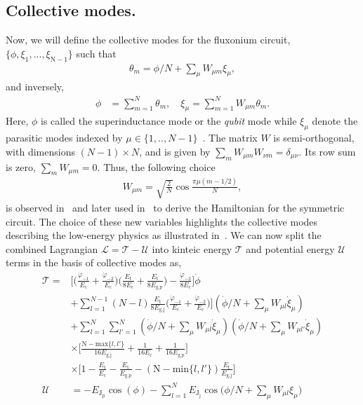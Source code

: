 \documentclass[%
reprint,
superscriptaddress,
 amsmath,amssymb,
 aps,
 prx,
longbibliography,
floatfix,
]{revtex4-2}
\begin{document}
\subsection{Collective modes.} 
Now, we will define the collective modes for the fluxonium circuit, $\{\phi,\xi_1,...,\xi_{\textrm{N}-1}\}$ such that 
\begin{align}
    \theta_m=\phi/N+\sum_\mu W_{\mu m}\xi_\mu,
\end{align}
and inversely,
\begin{align}
    \phi&=\sum_{m=1}^N\theta_m,\quad \xi_\mu=\sum_{m=1}^N W_{\mu m}\theta_m.
\end{align}
Here, $\phi$ is called the superinductance mode or the \emph{qubit} mode while $\xi_\mu$ denote the parasitic modes indexed by $\mu\in\{1,..,N-1\}$~\cite{ferguson2013symmetries}. The matrix $W$ is semi-orthogonal, with dimensions $(N-1)\times N$, and is given by $\sum_m W_{\mu m}W_{\nu m}=\delta_{\mu \nu}$. Its row sum is zero, $\sum_mW_{\mu m}=0$. Thus, the following choice
\begin{align}
    W_{\mu m}=\sqrt{\frac{2}{N}}\cos{\frac{\pi\mu(m-1/2)}{N}},
\end{align}
is observed in~\cite{ferguson2013symmetries} and later used in~\cite{viola2015collective} to derive the Hamiltonian for the symmetric circuit.
The choice of these new variables highlights the collective modes describing the low-energy physics as illustrated in~\cite{catelani2011relaxation,koch2009charging,manucharyan2009fluxonium}. We can now split the combined Lagrangian $\mathcal{L}=\mathcal{T}-\mathcal{U}$ into kinteic energy $\mathcal{T}$ and potential energy $
\mathcal{U}$ terms in the basis of collective modes as,
\begin{align}
\mathcal{T}=&\Big[\Big(\frac{\dot{\varphi}_{-1}}{E_{\textrm{c}}}+\frac{\dot{\varphi}_{-2}}{E_{\textrm{c}}}\Big)\Big(\frac{E_{\textrm{t}}}{8E_{\textrm{c}}}+\frac{E_{\textrm{t}}}{8E_{\textrm{g,p}}}\Big)-\frac{\dot{\varphi}_{-2}}{8E_{\textrm{c}}}\Big]\dot{\phi}\nonumber\\&+\sum_{l=1}^{N-1}(N-l)\frac{E_{\textrm{t}}}{8E_{\textrm{g,j}}}\Big(\frac{\dot{\varphi}_{-1}}{E_{\textrm{c}}}+\frac{\dot{\varphi}_{-2}}{E_{\textrm{c}}}\Big)\Big](\dot{\phi}/N+\sum_\mu W_{\mu l}\dot{\xi}_\mu)\nonumber\\
  &+\sum_{l=1}^N\sum_{l'=1}^N(\dot{\phi}/N+\sum_\mu W_{\mu l}\dot{\xi}_\mu)(\dot{\phi}/N+\sum_\mu W_{\mu l'}\dot{\xi}_\mu)\nonumber\\
  &\times\Big[\frac{\textrm{N}-\text{max}\{l,l'\}}{16E_\textrm{g,j}}+\frac{1}{16E_\textrm{c}}+\frac{1}{16E_\textrm{g,p}}\Big]\nonumber\\&\times\Big[1-\frac{E_\textrm{t}}{E_\textrm{c}}-\frac{E_\textrm{t}}{E_\textrm{g,p}}-(\textrm{N}-\text{min}\{l,l'\})\frac{E_\textrm{t}}{E_\textrm{g,j}}\Big]\label{eq:kin-energy}\\
    \mathcal{U}&=-E_{\textrm{J}_\textrm{p}}\cos(\phi)-\sum_{l=1}^NE_{\textrm{J}_\textrm{j}}\cos\Big(\phi/N+\sum_\mu W_{\mu l}\xi_\mu\Big)\label{eq:pot-energy}
\end{align}
\end{document}
